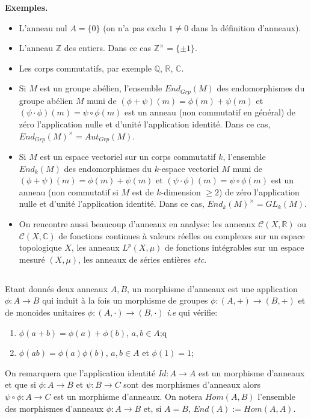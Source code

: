 \documentclass[a4paper, oneside, 12pt]{book}
\theoremstyle{definition} %
\newcommand{\Q}{\mathbb{Q}}
\newcommand{\C}{\mathbb{C}}
\newcommand{\Z}{\mathbb{Z}}
\newcommand{\R}{\mathbb{R}}
\begin{document}
\textbf{Exemples.}
\begin{itemize}[leftmargin=* ,parsep=0cm,itemsep=0cm,topsep=0cm]
\item L'anneau nul $A=\lbrace 0\rbrace$ (on n'a pas exclu $1\not=0$ dans la définition d'anneaux).
\item L'anneau  $\Z$ des entiers. Dans ce cas  $\Z^\times=\lbrace \pm 1\rbrace$.
\item Les corps commutatifs, par exemple $\Q$, $\R$, $\C$.  
\item Si $M$ est un groupe abélien, l'ensemble $End_{Grp}(M)$ des endomorphismes du groupe  abélien $M$ muni de $(\phi+\psi)(m)=\phi(m)+\psi(m)$ et $(\psi\cdot\phi)(m)=\psi\circ \phi(m)$ est  un anneau (non commutatif en général) de zéro l'application nulle et d'unité l'application identité. Dans ce cas,  $End_{Grp}(M)^\times=Aut_{Grp}(M)$.  
\item Si $M$ est un espace vectoriel sur un corps commutatif $k$, l'ensemble $End_k(M)$ des endomorphismes du $k$-espace vectoriel  $M$ muni de $(\phi+\psi)(m)=\phi(m)+\psi(m)$ et $(\psi\cdot\phi)(m)=\psi\circ \phi(m)$ est un anneau (non commutatif si $M$ est de $k$-dimension $\geq 2$) de zéro l'application nulle et d'unité l'application identité. Dans ce cas, $End_k(M)^\times=GL_k(M)$.
\item On rencontre aussi beaucoup d'anneaux en analyse: les anneaux $\mathcal{C}(X,\R)$ ou $\mathcal{C}(X,\C)$ de fonctions continues à valeurs réelles  ou complexes sur un espace topologique $X$, les anneaux $L^p(X,\mu)$ de fonctions intégrables  sur un espace mesuré $(X,\mu)$, les anneaux de séries entières \textit{etc}.\\
\end{itemize}




\subsection{}Etant donnés deux anneaux $A,B$, un morphisme d'anneaux est une application $\phi:A\rightarrow B$ qui induit à la fois un morphisme de groupes $\phi:(A,+)\rightarrow (B,+)$ et de monoides unitaires $\phi:(A,\cdot)\rightarrow (B,\cdot)$ \textit{i.e} qui vérifie:
\begin{enumerate}
\item $\phi(a+b)=\phi(a)+\phi(b)$, $a,b\in A$;q
\item $\phi(a  b)=\phi(a) \phi(b)$, $a,b\in A$ et $\phi(1)=1$;
\end{enumerate}
On remarquera que l'application identité $Id:A\rightarrow A$ est un morphisme d'anneaux et que si $\phi:A\rightarrow B$ et $\psi:B\rightarrow C$ sont des morphismes d'anneaux alors $\psi\circ \phi:A\rightarrow C$ est un morphisme d'anneaux. On notera $Hom(A,B)$ l'ensemble des morphismes d'anneaux $\phi:A\rightarrow B$ et, si $A=B$, $End(A):=Hom(A,A)$. \\
\end{document}
